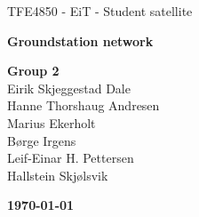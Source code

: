 \begin{titlepage}
\begin{center}

\vspace*{6cm}
{\Huge TFE4850 - EiT - Student satellite}

\vspace*{0.5cm}
{\LARGE\textbf{Groundstation network}}

\vspace*{0.7cm}
{\Large
	\textbf{Group 2}\\
	Eirik Skjeggestad Dale\\
	Hanne Thorshaug Andresen\\
	Marius Ekerholt\\
	Børge Irgens\\
	Leif-Einar H. Pettersen\\
	Hallstein Skjølsvik
}

{\vfill\textbf{\today}}

\end{center}
\end{titlepage}